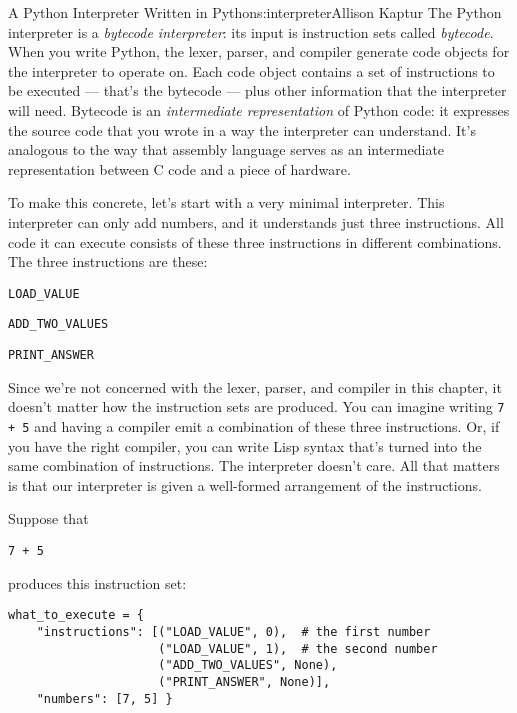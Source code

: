 \begin{aosachapter}{A Python Interpreter Written in Python}{s:interpreter}{Allison Kaptur}
The Python interpreter is a \emph{bytecode interpreter}: its input is
instruction sets called \emph{bytecode}. When you write Python, the
lexer, parser, and compiler generate code objects for the interpreter to
operate on. Each code object contains a set of instructions to be
executed --- that's the bytecode --- plus other information that the
interpreter will need. Bytecode is an \emph{intermediate representation}
of Python code: it expresses the source code that you wrote in a way the
interpreter can understand. It's analogous to the way that assembly
language serves as an intermediate representation between C code and a
piece of hardware.

\label{a-tiny-interpreter}

To make this concrete, let's start with a very minimal interpreter. This
interpreter can only add numbers, and it understands just three
instructions. All code it can execute consists of these three
instructions in different combinations. The three instructions are
these:

\begin{aosaitemize}

\item
  \texttt{LOAD\_VALUE}
\item
  \texttt{ADD\_TWO\_VALUES}
\item
  \texttt{PRINT\_ANSWER}
\end{aosaitemize}

Since we're not concerned with the lexer, parser, and compiler in this
chapter, it doesn't matter how the instruction sets are produced. You
can imagine writing \texttt{7 + 5} and having a compiler emit a
combination of these three instructions. Or, if you have the right
compiler, you can write Lisp syntax that's turned into the same
combination of instructions. The interpreter doesn't care. All that
matters is that our interpreter is given a well-formed arrangement of
the instructions.

Suppose that

\begin{verbatim}
7 + 5
\end{verbatim}

produces this instruction set:

\begin{verbatim}
what_to_execute = {
    "instructions": [("LOAD_VALUE", 0),  # the first number
                     ("LOAD_VALUE", 1),  # the second number
                     ("ADD_TWO_VALUES", None),
                     ("PRINT_ANSWER", None)],
    "numbers": [7, 5] }
\end{verbatim}


\end{aosachapter}

